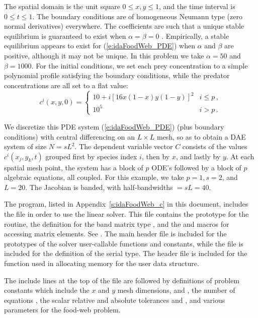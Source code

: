 The spatial domain is the unit square $0 \leq x,y \leq 1$, and the
time interval is $0 \leq t \leq 1$.  The boundary conditions are of
homogeneous Neumann type (zero normal derivatives) everywhere.  
The coefficients
are such that a unique stable equilibrium is guaranteed to exist when
$\alpha = \beta = 0$ \cite{Bro:86}.  Empirically, a stable equilibrium
appears to exist for (\ref{e:idaFoodWeb_PDE}) when $\alpha$ and $\beta$ are
positive, although it may not be unique. In this problem we take
$\alpha = 50$ and $\beta = 1000$.  For the initial conditions, we set
each prey concentration to a simple polynomial profile satisfying the
boundary conditions, while the predator concentrations are all set to
a flat value:
\begin{equation*}
c^i(x,y,0) = 
\begin{cases}
  10 + i [16x(1 - x)y(1 - y)]^2 & i \leq p \, , \\
  10^5                          & i > p \, .
\end{cases}
\end{equation*}

We discretize this PDE system (\ref{e:idaFoodWeb_PDE}) (plus boundary conditions)
with central differencing on an $L \times L$ mesh, so as to obtain a
DAE system of size $N = s L^2$.  The dependent variable vector $C$
consists of the values $c^i(x_j,y_k,t)$ grouped first by species index
$i$, then by $x$, and lastly by $y$.  At each spatial mesh point, the
system has a block of $p$ ODE's followed by a block of $p$ algebraic
equations, all coupled.
For this example, we take $p = 1, s = 2$, and $L = 20$.
The Jacobian is banded, with half-bandwidths  $= sL = 40$.

The  program, listed in Appendix~\ref{s:idaFoodWeb_c}
in this document,
includes the file  in order to use the {\idaband} linear solver. 
This file contains the prototype for the  routine,
the definition for the band matrix type , and the
 and  macros for accessing matrix
elements. See .
The main {\ida} header file  is included for the prototypes of the
solver user-callable functions and {\ida} constants, while the file
 is included for the definition of the serial
 type.  The header file  is included for the
 function used in allocating memory for the user data structure.

The include lines at the top of the file are followed by definitions of
problem constants which include the $x$ and $y$ mesh dimensions,  and
, the number of equations , the scalar relative and absolute
tolerances  and , and various parameters for the food-web problem.

